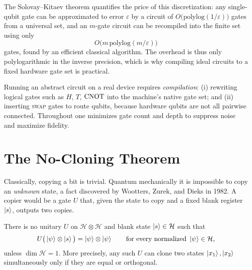 \begin{remark}
The Solovay--Kitaev theorem quantifies the price of this discretization: any
single-qubit gate can be approximated to error $\varepsilon$ by a circuit of
$O\!\big(\mathrm{polylog}(1/\varepsilon)\big)$ gates from a universal set, and an
$m$-gate circuit can be recompiled into the finite set using only
\[
  O\!\big(m\,\mathrm{polylog}(m/\varepsilon)\big)
\]
gates, found by an efficient classical algorithm. The overhead is thus only
polylogarithmic in the inverse precision, which is why compiling ideal circuits
to a fixed hardware gate set is practical.
\end{remark}

Running an abstract circuit on a real device requires \emph{compilation}:
(i) rewriting logical gates such as $H$, $T$, $\mathrm{CNOT}$ into the machine's
native gate set; and (ii) inserting \textsc{swap} gates to route qubits, because
hardware qubits are not all pairwise connected. Throughout one minimizes gate
count and depth to suppress noise and maximize fidelity.

\section{The No-Cloning Theorem}
\label{l2:sec:nocloning}

Classically, copying a bit is trivial. Quantum mechanically it is impossible to
copy an \emph{unknown} state, a fact discovered by Wootters, Zurek, and Dieks in
1982. A copier would be a gate $U$ that, given the state to copy and a fixed
blank register $\ket{s}$, outputs two copies.

\begin{theorem}
\label{l2:thm:nocloning}
There is no unitary $U$ on $\mathcal{H}\otimes\mathcal{H}$ and blank state
$\ket{s}\in\mathcal{H}$ such that
\[
  U\big(\ket{\psi}\otimes\ket{s}\big)=\ket{\psi}\otimes\ket{\psi}
  \qquad\text{for every normalized } \ket{\psi}\in\mathcal{H},
\]
unless $\dim\mathcal{H}=1$. More precisely, any such $U$ can clone two states
$\ket{x_{1}},\ket{x_{2}}$ simultaneously only if they are equal or orthogonal.
\end{theorem}

